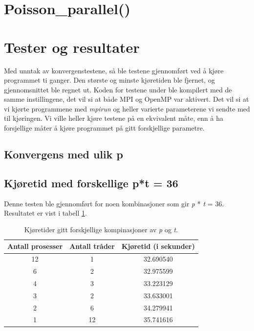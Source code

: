 \documentclass{article}
\begin{document}
\section{Poisson\_parallel()}

\section{Tester og resultater}
Med unntak av konvergenstestene, så ble testene gjennomført ved å kjøre programmet ti ganger. Den største og minste kjøretiden ble fjernet, og gjennomsnittet ble regnet ut. Koden for testene under ble kompilert med de samme instillingene, det vil si at både MPI og OpenMP var aktivert. 
Det vil si at vi kjørte programmene med \emph{mpirun} og heller varierte parameterene vi sendte med til kjøringen. Vi ville heller kjøre testene på en ekvivalent måte, enn å ha forsjellige måter å kjøre programmet på gitt forskjellige parametre. 

\subsection{Konvergens med ulik p}

\subsection{Kjøretid med forskellige p*t = 36}
Denne testen ble gjennomført for noen kombinasjoner som gir \emph{p} * \emph{t} = 36. Resultatet er vist i tabell \ref{p/t-table}.

\begin{table}
\begin{center}
	
	\begin{tabular}{c | c | c}
	\hline \hline 
	Antall prosesser      &    Antall tråder     &    Kjøretid (i sekunder) 	    \\ \hline	
	12		      &		1	     &	  32.690540       		    \\ \hline
	6		      &         2	     &    32.975599       		    \\ \hline
	4		      &         3	     &    33.223129	    		    \\ \hline
	3   		      &		2	     &    33.633001	    		    \\ \hline
	2		      &         6	     &    34.279941	    		    \\ \hline
	1		      &		12	     &    35.741616	    		    \\ \hline
	
	\end{tabular}
\end{center}
\caption{Kjøretider gitt forskjellige kompinasjoner av \emph{p} og \emph{t}.}
\label{p/t-table}
\end{table}
\end{document}
